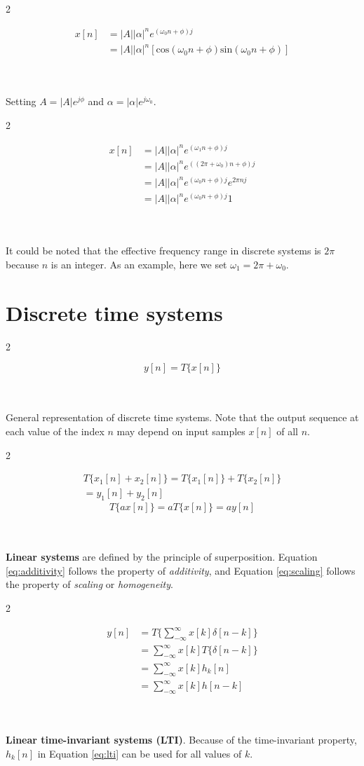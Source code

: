 \documentclass{article}
\theoremstyle{plain}
\newcommand{\myeq}[2]{
    \begin{multicols}{2}
            #1
    \columnbreak
        \\
        \\
        #2
    \end{multicols}
    \hrulefill
}
\begin{document}
\myeq{
    \begin{align}
        x[n] &= |A||\alpha|^n e^{(\omega_0 n + \phi)j} \\
        &= |A||\alpha|^n \left[ \text{cos}(\omega_0 n + \phi) \text{sin}(\omega_0 n + \phi) \right]
    \end{align}
}{Setting $A = |A|e^{j\phi}$ and $\alpha = |\alpha|e^{j\omega_0}$.}

\break

\myeq{
    \begin{align}
        x[n] &= |A||\alpha|^n e^{(\omega_1 n + \phi)j} \\
        &= |A||\alpha|^n e^{((2\pi + \omega_0)n + \phi)j} \\
        &= |A||\alpha|^n e^{(\omega_0 n + \phi)j} e^{2\pi nj} \\
        &= |A||\alpha|^n e^{(\omega_0 n + \phi)j}1
    \end{align}
    }{It could be noted that the effective frequency range in discrete systems is $2\pi$ because $n$ is an integer. As an example, here we set $\omega_1 = 2\pi + \omega_0$.}

\section{Discrete time systems}

\myeq{
    \begin{equation}
        y[n] = T\{x[n]\}
    \end{equation}
}
{General representation of discrete time systems. Note that the output sequence at each value of the index $n$ may depend on input samples $x[n]$ of all $n$.}

\myeq{
    \begin{multline} \label{eq:additivity}
        T\{x_1[n] + x_2[n]\} = T\{x_1[n]\} + T\{x_2[n]\} \\
        = y_1[n] + y_2[n]
    \end{multline}
    \begin{equation} \label{eq:scaling}
        T\{ax[n]\} = aT\{x[n]\} = ay[n]
    \end{equation}
}{\textbf{Linear systems} are defined by the principle of superposition. Equation \ref{eq:additivity} follows the property of \textit{additivity}, and Equation \ref{eq:scaling} follows the property of \textit{scaling} or \textit{homogeneity}.}

\myeq{
    \begin{align}
        y[n] &= T\{\sum^{\infty}_{-\infty}{x[k]\delta[n-k]}\} \\
        &= \sum^{\infty}_{-\infty}x[k]T\{\delta[n-k]\} \\
        &= \sum^{\infty}_{-\infty}x[k]h_k[n] \label{eq:lti}\\ 
        &= \sum^{\infty}_{-\infty}x[k]h[n-k] \label{eq:lti2}
    \end{align}
}{\textbf{Linear time-invariant systems (LTI)}. Because of the time-invariant property, $h_k[n]$ in Equation \ref{eq:lti} can be used for all values of $k$.}
\end{document}
